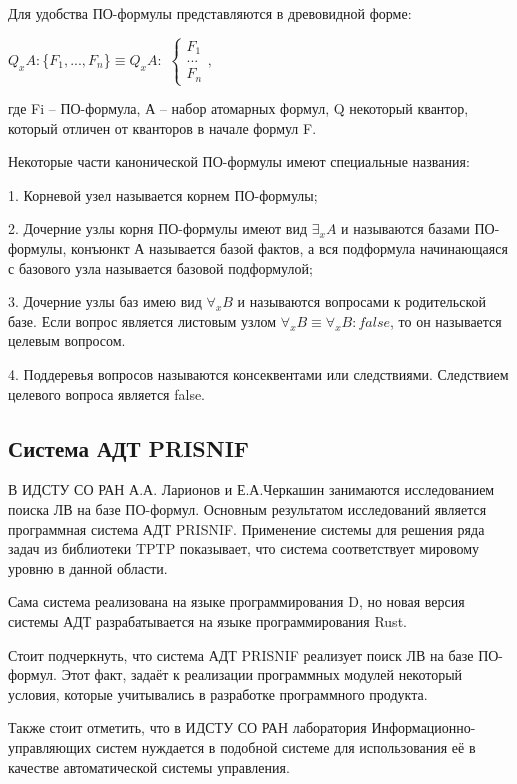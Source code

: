 Для удобства ПО-формулы представляются в древовидной форме:

$Q_x A: $\{$F_1,...,F_n$\}$ \equiv Q_x A:  $
\begin{math}
    \begin{cases}
        F_1\\
        ...\\
        F_n
    \end{cases},
\end{math}

 где Fi – ПО-формула, А – набор атомарных формул, Q некоторый квантор, который отличен от кванторов в начале формул F.

 Некоторые части канонической ПО-формулы имеют специальные названия:

 1. Корневой узел \forall\emptyset называется корнем ПО-формулы;

 2. Дочерние узлы корня ПО-формулы имеют вид $\exists_x A$ и называются базами ПО-формулы, конъюнкт А называется базой фактов, а вся подформула начинающаяся с базового узла называется базовой подформулой;

 3. Дочерние узлы баз имею вид $\forall_x B$ и называются вопросами к родительской базе. Если вопрос является листовым узлом $\forall_x B\equiv\forall_x B:false$, то он называется целевым вопросом.

 4. Поддеревья вопросов называются консеквентами или следствиями. Следствием целевого вопроса является false.

\subsection*{Система АДТ PRISNIF}

В ИДСТУ СО РАН А.А. Ларионов и Е.А.Черкашин занимаются исследованием поиска  ЛВ на базе ПО-формул. Основным результатом исследований является программная система АДТ PRISNIF. Применение системы для решения ряда задач из библиотеки TPTP показывает, что система соответствует мировому уровню в данной области.

Сама система реализована на языке программирования D, но новая версия системы АДТ разрабатывается на языке программирования Rust.

Стоит подчеркнуть, что система АДТ PRISNIF реализует поиск ЛВ на базе ПО-формул. Этот факт, задаёт к реализации программных модулей некоторый условия, которые учитывались в разработке программного продукта.

Также стоит отметить, что в ИДСТУ СО РАН лаборатория Информационно-управляющих систем нуждается в подобной системе для использования её в качестве автоматической системы управления.

